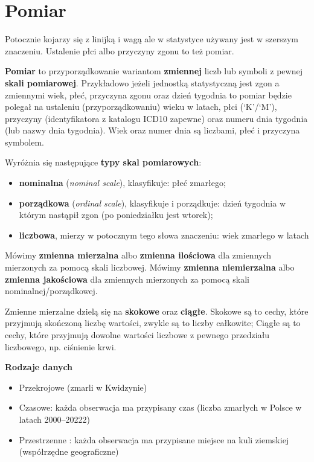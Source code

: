 \documentclass[
  openany]{book}
\begin{document}
\hypertarget{pomiar}{%
\section{Pomiar}\label{pomiar}}

Potocznie kojarzy się z linijką i wagą ale w statystyce używany jest w szerszym
znaczeniu. Ustalenie płci albo przyczyny zgonu to też pomiar.

\textbf{Pomiar} to przyporządkowanie wariantom \textbf{zmiennej} liczb lub symboli z pewnej \textbf{skali pomiarowej}.
Przykładowo jeżeli jednostką statystyczną jest zgon a zmiennymi
wiek, płeć,
przyczyna zgonu oraz dzień tygodnia to
pomiar będzie polegał na ustaleniu (przyporządkowaniu) wieku w latach,
płci (`K'/`M'), przyczyny (identyfikatora z katalogu ICD10 zapewne)
oraz numeru dnia tygodnia (lub nazwy dnia tygodnia).
Wiek oraz numer dnia są liczbami, płeć i przyczyna symbolem.

Wyróżnia się następujące \textbf{typy skal pomiarowych}:

\begin{itemize}
\item
  \textbf{nominalna} (\emph{nominal scale}), klasyfikuje: płeć zmarłego;
\item
  \textbf{porządkowa} (\emph{ordinal scale}), klasyfikuje i porządkuje: dzień tygodnia
  w którym nastąpił zgon (po poniedziałku jest wtorek);
\item
  \textbf{liczbowa}, mierzy w potocznym tego słowa znaczeniu: wiek zmarłego w latach
\end{itemize}

Mówimy \textbf{zmienna mierzalna} albo \textbf{zmienna ilościowa} dla zmiennych mierzonych
za pomocą skali liczbowej. Mówimy \textbf{zmienna niemierzalna} albo
\textbf{zmienna jakościowa} dla zmiennych mierzonych za pomocą skali
nominalnej/porządkowej.

Zmienne mierzalne dzielą się na \textbf{skokowe}
oraz \textbf{ciągłe}. Skokowe są to cechy, które przyjmują skończoną liczbę
wartości, zwykle są to liczby całkowite; Ciągłe są to cechy, które
przyjmują dowolne wartości liczbowe z pewnego przedziału liczbowego, np. ciśnienie krwi.

\textbf{Rodzaje danych}

\begin{itemize}
\item
  Przekrojowe (zmarli w Kwidzynie)
\item
  Czasowe: każda obserwacja ma przypisany czas (liczba zmarłych w Polsce w latach 2000--20222)
\item
  Przestrzenne : każda obserwacja ma przypisane miejsce na kuli ziemskiej (współrzędne geograficzne)
\end{itemize}
\end{document}
